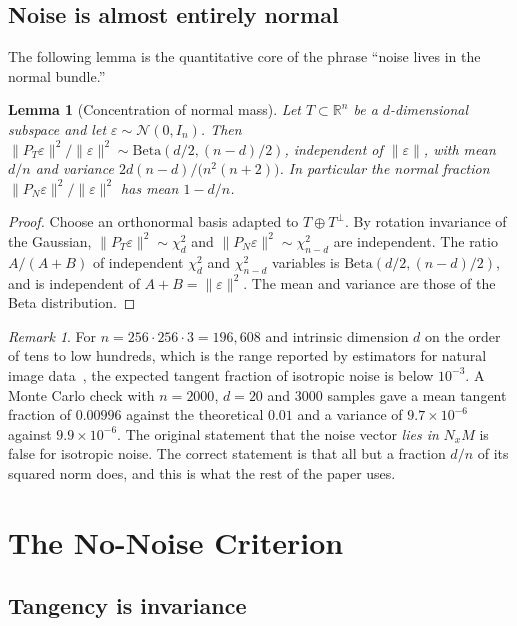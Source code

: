\documentclass[11pt,a4paper]{article}
\newtheorem{lemma}[theorem]{Lemma}
\theoremstyle{definition}
\theoremstyle{remark}
\newtheorem{remark}[theorem]{Remark}
\newcommand{\R}{\mathbb{R}}
\newcommand{\NM}[1]{N_{#1}M}
\begin{document}
\subsection{Noise is almost entirely normal}

The following lemma is the quantitative core of the phrase ``noise lives
in the normal bundle.''

\begin{lemma}[Concentration of normal mass]\label{lem:concentration}
Let $T\subset\R^n$ be a $d$-dimensional subspace and let
$\varepsilon\sim\mathcal{N}(0,I_n)$. Then
$\|P_T\varepsilon\|^2/\|\varepsilon\|^2\sim\mathrm{Beta}(d/2,(n-d)/2)$,
independent of $\|\varepsilon\|$, with mean $d/n$ and variance
$2d(n-d)/\bigl(n^2(n+2)\bigr)$. In particular the normal fraction
$\|P_N\varepsilon\|^2/\|\varepsilon\|^2$ has mean $1-d/n$.
\end{lemma}

\begin{proof}
Choose an orthonormal basis adapted to $T\oplus T^\perp$. By rotation
invariance of the Gaussian, $\|P_T\varepsilon\|^2\sim\chi^2_d$ and
$\|P_N\varepsilon\|^2\sim\chi^2_{n-d}$ are independent. The ratio
$A/(A+B)$ of independent $\chi^2_d$ and $\chi^2_{n-d}$ variables is
$\mathrm{Beta}(d/2,(n-d)/2)$, and is independent of $A+B=\|\varepsilon\|^2$.
The mean and variance are those of the Beta distribution.
\end{proof}

\begin{remark}
For $n=256\cdot256\cdot3=196{,}608$ and intrinsic dimension $d$ on the
order of tens to low hundreds, which is the range reported by estimators
for natural image data~\cite{pope2021intrinsic}, the expected tangent
fraction of isotropic noise is below $10^{-3}$. A Monte Carlo check with
$n=2000$, $d=20$ and $3000$ samples gave a mean tangent fraction of
$0.00996$ against the theoretical $0.01$ and a variance of
$9.7\times10^{-6}$ against $9.9\times10^{-6}$. The original statement that
the noise vector \emph{lies in} $\NM{x}$ is false for isotropic noise. The
correct statement is that all but a fraction $d/n$ of its squared norm
does, and this is what the rest of the paper uses.
\end{remark}

\section{The No-Noise Criterion}

\subsection{Tangency is invariance}
\end{document}
